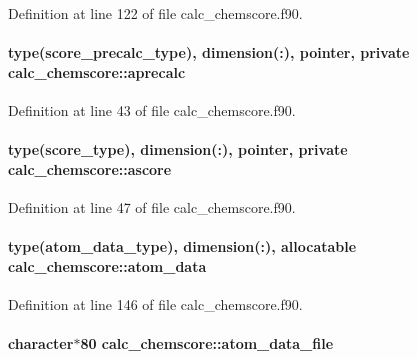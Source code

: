 Definition at line 122 of file calc\-\_\-chemscore.\-f90.

\hypertarget{classcalc__chemscore_a586a968234f3a2338f8f7a045122ccb7}{
\paragraph[{aprecalc}]{\setlength{\rightskip}{0pt plus 5cm}type({\bf score\-\_\-precalc\-\_\-type}), dimension(\-:), pointer, private calc\-\_\-chemscore\-::aprecalc\hspace{0.3cm}{\ttfamily [private]}}}\label{classcalc__chemscore_a586a968234f3a2338f8f7a045122ccb7}


Definition at line 43 of file calc\-\_\-chemscore.\-f90.

\hypertarget{classcalc__chemscore_ab15cb5a3ebf1b4cff3c3a65acbf76159}{
\paragraph[{ascore}]{\setlength{\rightskip}{0pt plus 5cm}type({\bf score\-\_\-type}), dimension(\-:), pointer, private calc\-\_\-chemscore\-::ascore\hspace{0.3cm}{\ttfamily [private]}}}\label{classcalc__chemscore_ab15cb5a3ebf1b4cff3c3a65acbf76159}


Definition at line 47 of file calc\-\_\-chemscore.\-f90.

\hypertarget{classcalc__chemscore_a4de84d0dd19f0b32599251fb0812813c}{
\paragraph[{atom\-\_\-data}]{\setlength{\rightskip}{0pt plus 5cm}type({\bf atom\-\_\-data\-\_\-type}), dimension(\-:), allocatable calc\-\_\-chemscore\-::atom\-\_\-data}}\label{classcalc__chemscore_a4de84d0dd19f0b32599251fb0812813c}


Definition at line 146 of file calc\-\_\-chemscore.\-f90.

\hypertarget{classcalc__chemscore_ae6953c3a16fa9621b6b6c4686a740711}{
\paragraph[{atom\-\_\-data\-\_\-file}]{\setlength{\rightskip}{0pt plus 5cm}character$\ast$80 calc\-\_\-chemscore\-::atom\-\_\-data\-\_\-file}}\label{classcalc__chemscore_ae6953c3a16fa9621b6b6c4686a740711}


